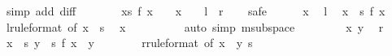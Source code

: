 \begin{isabellebody}
\ {\isacharparenleft}{\kern0pt}simp\ add{\isacharcolon}{\kern0pt}\ diff{\isacharparenright}{\kern0pt}\isanewline
\ \ \isamarkupfalse%
\ \isamarkupfalse%
\ {\isachardoublequoteopen}{\isasymdots}\ {\isasymlongleftrightarrow}\ {\isacharparenleft}{\kern0pt}{\isasymforall}x{\isasymin}s{\isachardot}{\kern0pt}\ f\ x\ {\isacharequal}{\kern0pt}\ {}\ {\isasymlongrightarrow}\ x\ {\isacharequal}{\kern0pt}\ {}{\isacharparenright}{\kern0pt}{\isachardoublequoteclose}\ {\isacharparenleft}{\kern0pt}\ {\isachardoublequoteopen}{\isacharquery}{\kern0pt}l\ {\isacharequal}{\kern0pt}\ {\isacharquery}{\kern0pt}r{\isachardoublequoteclose}{\isacharparenright}{\kern0pt}\isanewline
\ \ \isamarkupfalse%
\ safe\isanewline
\ \ \ \ \isamarkupfalse%
\ x\ \isamarkupfalse%
\ {\isacharquery}{\kern0pt}l\ \isamarkupfalse%
\ {\isachardoublequoteopen}x\ {\isasymin}\ s{\isachardoublequoteclose}\ {\isachardoublequoteopen}f\ x\ {\isacharequal}{\kern0pt}\ {}{\isachardoublequoteclose}\ \isamarkupfalse%
\ {\isacartoucheopen}{\isacharquery}{\kern0pt}l{\isacartoucheclose}{\isacharbrackleft}{\kern0pt}rule{\isacharunderscore}{\kern0pt}format{\isacharcomma}{\kern0pt}\ of\ x\ {}{\isacharbrackright}{\kern0pt}\ s\ \isamarkupfalse%
\ {\isachardoublequoteopen}x\ {\isacharequal}{\kern0pt}\ {}{\isachardoublequoteclose}\isanewline
\ \ \ \ \ \ \isamarkupfalse%
\ {\isacharparenleft}{\kern0pt}auto\ simp{\isacharcolon}{\kern0pt}\ m{}{\isachardot}{\kern0pt}subspace{\isacharunderscore}{\kern0pt}{}{\isacharparenright}{\kern0pt}\isanewline
\ \ \isamarkupfalse%
\isanewline
\ \ \ \ \isamarkupfalse%
\ x\ y\ \isamarkupfalse%
\ {\isacharquery}{\kern0pt}r\ \isamarkupfalse%
\ {\isachardoublequoteopen}x\ {\isasymin}\ s{\isachardoublequoteclose}\ {\isachardoublequoteopen}y\ {\isasymin}\ s{\isachardoublequoteclose}\ {\isachardoublequoteopen}f\ {\isacharparenleft}{\kern0pt}x\ {\isacharminus}{\kern0pt}\ y{\isacharparenright}{\kern0pt}\ {\isacharequal}{\kern0pt}\ {}{\isachardoublequoteclose}\isanewline
\ \ \ \ \isamarkupfalse%
\ {\isacartoucheopen}{\isacharquery}{\kern0pt}r{\isacartoucheclose}{\isacharbrackleft}{\kern0pt}rule{\isacharunderscore}{\kern0pt}format{\isacharcomma}{\kern0pt}\ of\ {\isachardoublequoteopen}x\ {\isacharminus}{\kern0pt}\ y{\isachardoublequoteclose}{\isacharbrackright}{\kern0pt}\ s\isanewline

\end{isabellebody}
